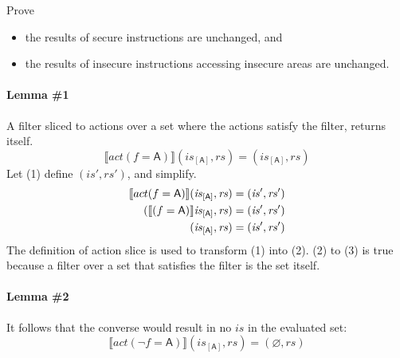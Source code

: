 \documentclass[12pt, letterpaper]{article}
\let\emptyset\varnothing
\begin{document}
Prove
\begin{itemize}
    \item the results of secure instructions are unchanged, and
    \item the results of insecure instructions accessing insecure areas are unchanged.
\end{itemize}

\paragraph{Lemma \#1}
    A filter sliced to actions over a set where the actions satisfy the filter, returns itself.
\[
    \llbracket act(f=\mathsf{A}) \rrbracket (\mathit{is}_{[\mathsf{A}]}, \mathit{rs}) = (\mathit{is_{[\mathsf{A}]}}, \mathit{rs})
\]
    Let (1) define $(\mathit{is}', \mathit{rs}')$, and simplify.
\begin{align}
    \setcounter{equation}{0}
    \llbracket act(f=\mathsf{A}) \rrbracket (\mathit{is}_{[\mathsf{A}]}, \mathit{rs})
    &= 
    (\mathit{is}', \mathit{rs}')
    \\
    (\llbracket (f=\mathsf{A}) \rrbracket \mathit{is}_{[\mathsf{A}]}, \mathit{rs})
    &= 
    (\mathit{is}', \mathit{rs}')
    \\
    (\mathit{is}_{[\mathsf{A}]}, \mathit{rs})
    &= 
    (\mathit{is}', \mathit{rs}')
\end{align}
    The definition of action slice is used to transform (1) into (2).  (2) to (3) is true because a filter over a set that satisfies the filter is the set itself.\\
\paragraph{Lemma \#2}
    It follows that the converse would result in no $\mathit{is}$ in the evaluated set:
\[
    \llbracket act(\neg f=\mathsf{A}) \rrbracket (\mathit{is}_{[\mathsf{A}]}, \mathit{rs}) = (\emptyset, \mathit{rs})
\]
\end{document}
